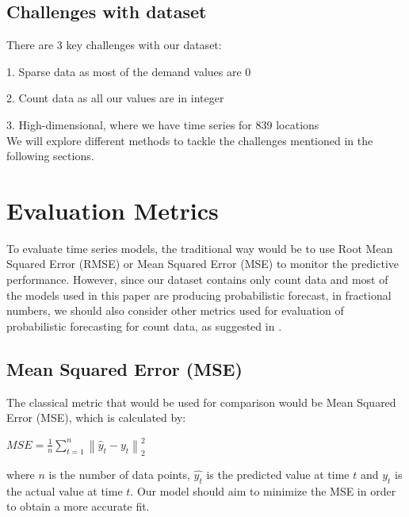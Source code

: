 \documentclass[nonblindrev,msom]{informs3} %
\begin{document}
\subsection{Challenges with dataset}

There are 3 key challenges with our dataset:

	1. Sparse data as most of the demand values are 0
	
	2. Count data as all our values are in integer
	
	3. High-dimensional, where we have time series for 839 locations \\
	
\noindent We will explore different methods to tackle the challenges mentioned in the following sections. 


\newpage

\section{Evaluation Metrics}

To evaluate time series models, the traditional way would be to use Root Mean Squared Error (RMSE) or Mean Squared Error (MSE) to monitor the predictive performance. However, since our dataset contains only count data and most of the models used in this paper are producing probabilistic forecast, in fractional numbers, we should also consider other metrics used for evaluation of probabilistic forecasting for count data, as suggested in \cite{Czado2009PredictiveMA}.

\subsection{Mean Squared Error (MSE)}
The classical metric that would be used for comparison would be Mean Squared Error (MSE), which is calculated by: \\

\begin{center}
    $\displaystyle MSE=\frac{1}{n}\sum_{t=1}^{n}\left \| \hat{y}_{t} - y_{t} \right \|_{2}^{2}$
\end{center}
where $n$ is the number of data points, $\hat{y_t}$ is the predicted value at time $t$ and ${y_t}$ is the actual value at time $t$. Our model should aim to minimize the MSE in order to obtain a more accurate fit. \\
\end{document}
